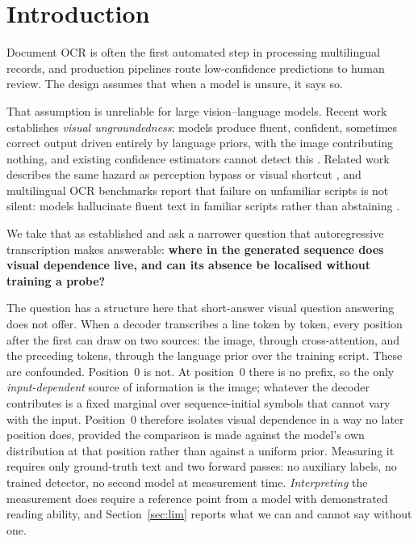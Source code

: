 \documentclass{article}
\begin{document}
\begin{abstract}
accuracy is zero, it carries no usable correctness signal. We read this as a model whose certainty tracks the linguistic plausibility
of what it generates rather than the state of its own perception. Because visual dependence in
transcription is concentrated at the start of the sequence, a confidence score averaged
uniformly over generated tokens dilutes the one position that carries it; confidence measures
for transcription should weight early positions rather than averaging uniformly. We do not
exclude the possibility that this instrument never acquired a visual representation that
transfers to the evaluation renderer, and we state what would separate that from visual bypass.
\end{abstract}

\section{Introduction}

Document OCR is often the first automated step in processing multilingual records, and
production pipelines route low-confidence predictions to human review. The design assumes that
when a model is unsure, it says so.

That assumption is unreliable for large vision--language models. Recent work establishes
\emph{visual ungroundedness}: models produce fluent, confident, sometimes correct output
driven entirely by language priors, with the image contributing nothing, and existing
confidence estimators cannot detect this \citep{khanmohammadi2026bicr}. Related work describes
the same hazard as perception bypass or visual shortcut \citep{xu2026bypass}, and
multilingual OCR benchmarks report that failure on unfamiliar scripts is not silent: models
hallucinate fluent text in familiar scripts rather than abstaining
\citep{kargaran2026glotocr}.

We take that as established and ask a narrower question that autoregressive transcription
makes answerable: \textbf{where in the generated sequence does visual dependence live, and can
its absence be localised without training a probe?}

The question has a structure here that short-answer visual question answering does not offer.
When a decoder transcribes a line token by token, every position after the first can draw on
two sources: the image, through cross-attention, and the preceding tokens, through the
language prior over the training script. These are confounded. Position~0 is not. At
position~0 there is no prefix, so the only \emph{input-dependent} source of information is the
image; whatever the decoder contributes is a fixed marginal over sequence-initial symbols that
cannot vary with the input. Position~0 therefore isolates visual dependence in a way no later
position does, provided the comparison is made against the model's own distribution at that
position rather than against a uniform prior. Measuring it requires only ground-truth text and
two forward passes: no auxiliary labels, no trained detector, no second model at measurement
time. \emph{Interpreting} the measurement does require a reference point from a model with
demonstrated reading ability, and Section~\ref{sec:lim} reports what we can and cannot say
without one.
\end{document}
